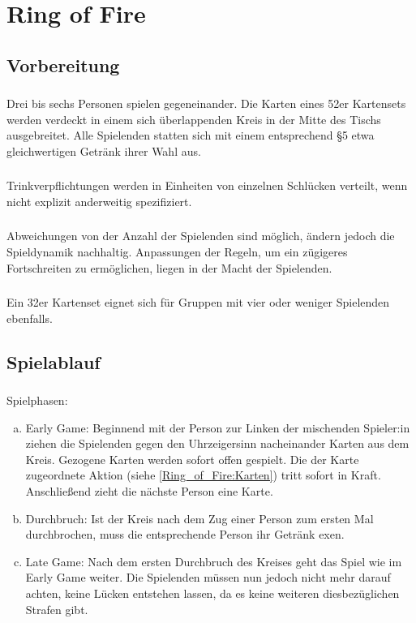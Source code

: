 \section{Ring of Fire}
\subsection{Vorbereitung}
\subsubsection{}
Drei bis sechs Personen spielen gegeneinander. Die Karten eines 52er Kartensets werden verdeckt in einem sich überlappenden Kreis in der Mitte des Tischs ausgebreitet. Alle Spielenden statten sich mit einem entsprechend §5 etwa gleichwertigen Getränk ihrer Wahl aus.

\subsubsection{}
Trinkverpflichtungen werden in Einheiten von einzelnen Schlücken verteilt, wenn nicht explizit anderweitig spezifiziert.

\subsubsection{}
Abweichungen von der Anzahl der Spielenden sind möglich, ändern jedoch die Spieldynamik nachhaltig. Anpassungen der Regeln, um ein zügigeres Fortschreiten zu ermöglichen, liegen in der Macht der Spielenden.

\subsubsection{}
Ein 32er Kartenset eignet sich für Gruppen mit vier oder weniger Spielenden ebenfalls.

\subsection{Spielablauf}
\subsubsection{}
Spielphasen:
\begin{enumerate}[a.]
	\item Early Game: Beginnend mit der Person zur Linken der mischenden Spieler:in ziehen die Spielenden gegen den Uhrzeigersinn nacheinander Karten aus dem Kreis.
	Gezogene Karten werden sofort offen gespielt. Die der Karte zugeordnete Aktion (siehe \ref*{Ring_of_Fire:Karten}) tritt sofort in Kraft.
	Anschließend zieht die nächste Person eine Karte.
	\item Durchbruch: Ist der Kreis nach dem Zug einer Person zum ersten Mal durchbrochen, muss die entsprechende Person ihr Getränk exen.
	\item Late Game: Nach dem ersten Durchbruch des Kreises geht das Spiel wie im Early Game weiter.
	Die Spielenden müssen nun jedoch nicht mehr darauf achten, keine Lücken entstehen lassen, da es keine weiteren diesbezüglichen Strafen gibt.
\end{enumerate}

